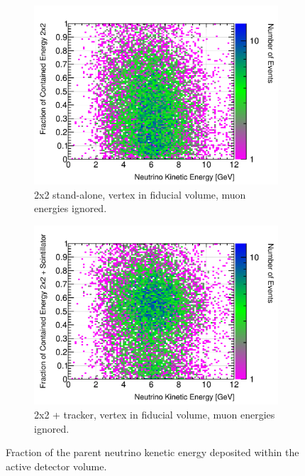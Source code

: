 \documentclass[10pt,a4paper,openany]{article}
\begin{document}
\begin{figure}[htbp]
	\centering
	\begin{subfigure}[b]{0.49\textwidth}
		\centering
		\includegraphics[width=1.0\textwidth]{E_contained_frac_2x2_fiducial_gap_no_muon.png}
		\caption{2x2 stand-alone, vertex in fiducial volume, muon energies ignored.}
		\label{}
	\end{subfigure}	
	\hfill
	\begin{subfigure}[b]{0.49\textwidth}
		\centering
		\includegraphics[width=1.0\textwidth]{E_contained_frac_2x2_Scintillator_fiducial_gap_no_muon.png}
		\caption{2x2 + tracker, vertex in fiducial volume, muon energies ignored.}
		\label{}
	\end{subfigure}
  \caption{Fraction of the parent neutrino kenetic energy deposited within the active detector volume.}
\end{figure}
\end{document}
